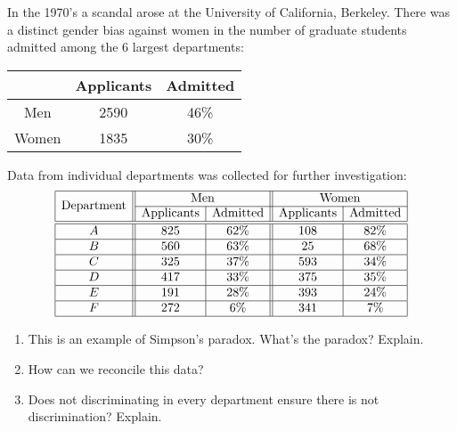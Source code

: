 \documentclass[nooutcomes,noauthor,hints,handout,12pt]{ximera}
\begin{document}
\begin{question}
In the 1970's a scandal arose at the University of California,
Berkeley. There was a distinct gender bias against women in the number
of graduate students admitted among the 6 largest departments:
\begin{center}
\begin{tabular}{|c||c|c|} \hline
 & Applicants & Admitted \\ \hline\hline
Men & 2590 & 46\% \\ \hline
Women & 1835 & 30\% \\ \hline
\end{tabular}
\end{center}
Data from individual departments was collected for further investigation:
\[
\begin{array}{|c||c|c||c|c|} \hline
\multirow{2}{*}{\text{Department}} & \multicolumn{2}{c||}{\text{Men}} & \multicolumn{2}{c|}{\text{Women}}  \\\cline{2-5}
 & \text{Applicants} & \text{Admitted} & \text{Applicants} & \text{Admitted} \\\hline\hline
A & 825 & 62\% & 108 & 82\%\\ \hline
B & 560 & 63\% & 25 & 68\% \\ \hline
C & 325 & 37\% & 593 & 34\% \\ \hline
D & 417 & 33\% & 375 & 35\% \\ \hline
E & 191 & 28\% & 393 & 24\% \\ \hline
F & 272 & 6\% & 341 & 7\% \\ \hline
\end{array}
\]

\begin{enumerate}
\item This is an example of Simpson's paradox. What's the paradox? Explain.
\item How can we reconcile this data?
\item Does not discriminating in every department ensure there is not discrimination? Explain.
\end{enumerate}

\end{question}
\end{document}
